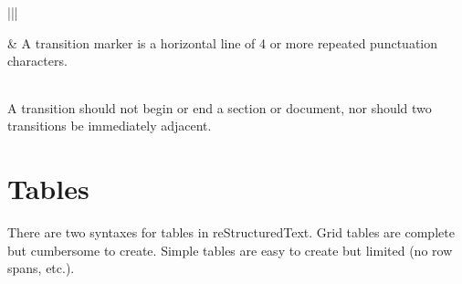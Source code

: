 \documentclass[letterpaper,10pt,english]{sphinxmanual}
\begin{document}
\begin{savenotes}
\begin{tabular}[t]{|*{2}{|}}
\begin{sphinxVerbatimintable}[commandchars=\\\{\}]

       
     
   
\end{sphinxVerbatimintable}
&
A transition marker is a horizontal line
of 4 or more repeated punctuation
characters.


\begin{savenotes}\sphinxattablestart
\centering
\begin{tabulary}{\linewidth}[t]{|T|}
\hline
\\
\hline
\end{tabulary}
\par
\sphinxattableend\end{savenotes}

A transition should not begin or end a
section or document, nor should two
transitions be immediately adjacent.
\\
\hline
\end{tabular}
\par
\sphinxattableend\end{savenotes}




\section{Tables}
\label{\detokenize{rst-cheatsheet/rst-cheatsheet:tables}}
There are two syntaxes for tables in reStructuredText. Grid tables are complete but cumbersome to create. Simple
tables are easy to create but limited (no row spans, etc.).
\end{document}
